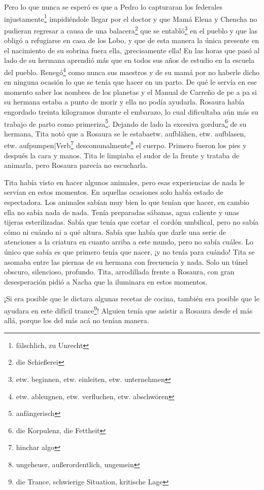 Pero lo que nunca se esperó es que a Pedro lo capturaran los federales injustamente\footnote{fälschlich, zu Unrecht} impidiéndole
llegar por el doctor y que Mamá Elena y Chencha no pudieran regresar
a causa de una balacera\footnote{die Schießerei}
que se entabló\footnote{etw. beginnen, etw. einleiten, etw. unternehmen}
en el pueblo y que las obligó a refugiarse en casa de los Lobo, y que de
esta manera la única presente en el nacimiento de su sobrina fuera ella,
¡precisamente ella! En las horas que pasó al lado de su hermana aprendió
más que en todos sus años de estudio en la escuela del pueblo. Renegó\footnote{etw. ableugnen, etw. verfluchen, etw. abschwören}
como nunca sus maestros y de su mamá por no haberle dicho en ninguna
ocasión lo que se tenía que hacer en un parto.
De qué le servía en ese momento saber los nombres de los planetas y el
Manual de Carreño de pe a pa si su hermana estaba a punto de morir y
ella no podía ayudarla.
Rosaura había engordado treinta kilogramos durante el embarazo, lo cual
dificultaba aún más su trabajo de parto como primeriza\footnote{anfängerisch}.
Dejando de lado la excesiva gordura\footnote{die Korpulenz, die Fettheit}
de su hermana, Tita notó que a Rosaura se le estabaetw. aufblähen, etw. aufblasen, etw. aufpumpen|Verb\footnote{hinchar algo} descomunalmente\footnote{ungeheuer, außerordentlich, ungemein} el
cuerpo. Primero fueron los pies y después la cara y manos. Tita le limpiaba
el sudor de la frente y trataba de animarla, pero Rosaura parecía no
escucharla.

Tita había visto en hacer algunos animales, pero esas experiencias de
nada le servían en estos momentos. En aquellas ocasiones solo había
estado de espectadora. Los animales sabían muy bien lo que tenían que
hacer, en cambio ella no sabía nada de nada. Tenía preparadas sábanas,
agua caliente y unas tijeras esterilizadas. Sabía que tenía que cortar~el cordón umbilical, pero no sabía cómo ni cuándo ni a qué altura.
Sabía que había que darle una serie de atenciones a la criatura en
cuanto arriba a este mundo, pero no sabía cuáles. Lo único que sabía es
que primero tenía que nacer, ¡y no tenía para cuándo! Tita se asomaba
entre las piernas de su hermana con frecuencia y nada. Solo un túnel
obscuro, silencioso, profundo. Tita, arrodillada frente a Rosaura, con
gran desesperación pidió a Nacha que la iluminara en estos momentos.

¡Si era posible que le dictara algunas recetas de cocina, también era
posible que le ayudara en este difícil trance\footnote{die Trance, schwierige Situation, kritische Lage}!
Alguien tenía que asistir a Rosaura desde el más allá, porque los del más
acá no tenían manera.

